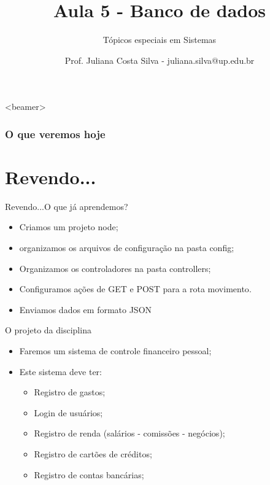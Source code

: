 \documentclass{beamer}
\title{Aula 5  - Banco de dados}
\subtitle{Tópicos especiais em Sistemas}
\author{Prof. Juliana Costa Silva - juliana.silva@up.edu.br}
\begin{document}
  \frame[c]{\maketitle}
      \begin{frame}<beamer>
      \frametitle{O que veremos hoje}
      \tableofcontents
    \end{frame}
    \section{Revendo...}
    \begin{frame}{Revendo...}{O que já aprendemos?}
      
      \begin{itemize}
            \item Criamos um projeto node;
            \item organizamos os arquivos de configuração na pasta config;
            \item Organizamos os controladores na pasta controllers;
            \item Configuramos ações de GET e POST para a rota \alert{movimento}.
            \item Enviamos dados em formato JSON
       \end{itemize}
     \end{frame}
\begin{frame}[label=proof]{O projeto da disciplina}
	\begin{itemize}
	\item Faremos um sistema de controle financeiro pessoal;
	\item Este sistema deve ter:
	\begin{itemize}
	\item Registro de gastos;
	\item Login de usuários;
	\item Registro de renda (salários - comissões - negócios);
	\item Registro de cartões de créditos;
	\item Registro de contas bancárias;
	\end{itemize}
	\end{itemize}
    \end{frame}
\end{document}
